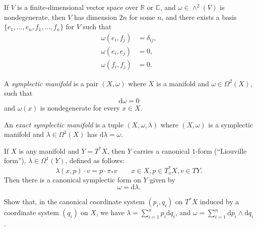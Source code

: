 \documentclass[12pt,letterpaper,reqno]{article}
\numberwithin{equation}{section}
\newcommand{\R}{\ensuremath{\mathbb R}}
\newcommand{\C}{\ensuremath{\mathbb C}}
\newcommand{\de}{\mathrm{d}}
\newcommand{\ti}[1]{\textit{#1}}
\begin{document}
\begin{prop}
\label{prop:standard-nondegenerate-skew-pairing}
If $V$ is a finite-dimensional vector space over $\R$ or $\C$, and
$\omega \in \wedge^2(V)$ is nondegenerate, then $V$ has
dimension $2n$ for some $n$, and there
exists a basis $\{e_1, \dots, e_n, f_1, \dots, f_n\}$ for $V$
such that
\begin{align}
\omega(e_i, f_j) &= \delta_{ij}, \\
\omega(e_i, e_j) &= 0, \\
\omega(f_i, f_j) &= 0.
\end{align}
\end{prop}

\begin{defn} \label{def:symplectic-manifold}
A \ti{symplectic manifold} is a pair $(X,\omega)$
where $X$ is a manifold and
$\omega \in \Omega^2(X)$, such that
\begin{equation}
  \de \omega = 0
\end{equation}
and $\omega(x)$ is nondegenerate for every $x \in X$.
\end{defn}

\begin{defn}
An \ti{exact symplectic manifold} is a tuple $(X,\omega,\lambda)$
where $(X,\omega)$ is a symplectic manifold and $\lambda \in \Omega^1(X)$ has $\de \lambda = \omega$.
\end{defn}

\begin{example}
If $X$ is any manifold and $Y = T^* X$, then $Y$ carries a canonical
$1$-form (``Liouville form''), $\lambda \in \Omega^1(Y)$,
defined as follows:
\begin{equation}
  \lambda(x,p) \cdot v = p \cdot \pi_* v \qquad x \in X, p \in T^*_x X, v \in TY.
\end{equation}
Then there is a canonical symplectic form on $Y$ given by
\begin{equation}
\omega = \de \lambda.
\end{equation}
\end{example}

\begin{exercise}
Show that, in the canonical coordinate system $(p_i,q_i)$
on $T^* X$ induced by a coordinate system $(q_i)$ on $X$,
we have
$\lambda = \sum_{i=1}^n p_i \de q_i$, and
$\omega = \sum_{i=1}^n \de p_i \wedge \de q_i$.
\end{exercise}
\end{document}
